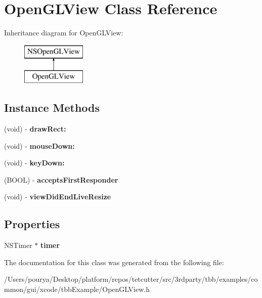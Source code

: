 \hypertarget{interfaceOpenGLView}{}\section{Open\+G\+L\+View Class Reference}
\label{interfaceOpenGLView}
Inheritance diagram for Open\+G\+L\+View\+:\begin{figure}[H]
\begin{center}
\leavevmode
\includegraphics[height=2.000000cm]{interfaceOpenGLView}
\end{center}
\end{figure}
\subsection*{Instance Methods}
\begin{DoxyCompactItemize}
\item 
\hypertarget{interfaceOpenGLView_a65d2f3038f9d33694fd3a3d8447569dc}{}(void) -\/ {\bfseries draw\+Rect\+:}\label{interfaceOpenGLView_a65d2f3038f9d33694fd3a3d8447569dc}

\item 
\hypertarget{interfaceOpenGLView_abab2fe6a66942c6835e7bc524a7fc7c5}{}(void) -\/ {\bfseries mouse\+Down\+:}\label{interfaceOpenGLView_abab2fe6a66942c6835e7bc524a7fc7c5}

\item 
\hypertarget{interfaceOpenGLView_a2a580faa15d1bb5ce351e666d1367da0}{}(void) -\/ {\bfseries key\+Down\+:}\label{interfaceOpenGLView_a2a580faa15d1bb5ce351e666d1367da0}

\item 
\hypertarget{interfaceOpenGLView_a81ba458017371d331563a4b0e506e598}{}(B\+O\+O\+L) -\/ {\bfseries accepts\+First\+Responder}\label{interfaceOpenGLView_a81ba458017371d331563a4b0e506e598}

\item 
\hypertarget{interfaceOpenGLView_a683c64a7c35459eefe86b3c1ca7b8f95}{}(void) -\/ {\bfseries view\+Did\+End\+Live\+Resize}\label{interfaceOpenGLView_a683c64a7c35459eefe86b3c1ca7b8f95}

\end{DoxyCompactItemize}
\subsection*{Properties}
\begin{DoxyCompactItemize}
\item 
\hypertarget{interfaceOpenGLView_aa61c4aa5588d077946ad526743473688}{}N\+S\+Timer $\ast$ {\bfseries timer}\label{interfaceOpenGLView_aa61c4aa5588d077946ad526743473688}

\end{DoxyCompactItemize}


The documentation for this class was generated from the following file\+:\begin{DoxyCompactItemize}
\item 
/\+Users/pourya/\+Desktop/platform/repos/tetcutter/src/3rdparty/tbb/examples/common/gui/xcode/tbb\+Example/Open\+G\+L\+View.\+h\end{DoxyCompactItemize}
